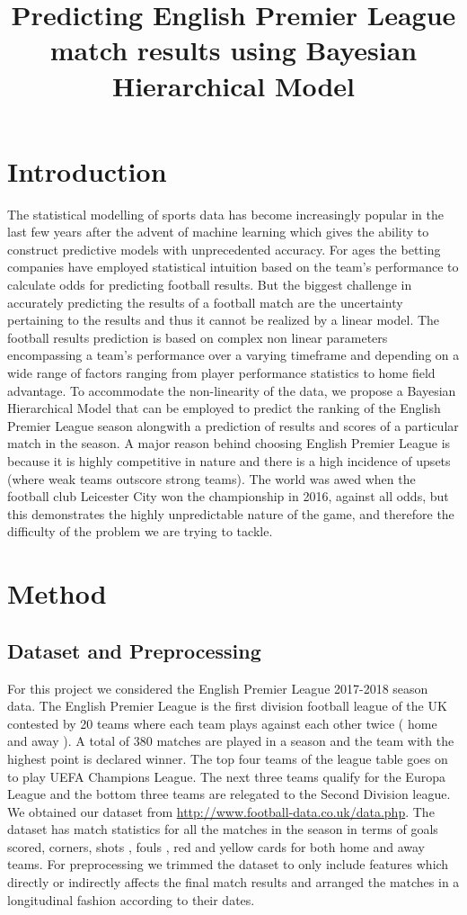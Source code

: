 \documentclass{article}
\title{Predicting English Premier League match results using Bayesian Hierarchical Model}
\begin{document}
\maketitle

\section{Introduction}
The statistical modelling of sports data has become increasingly popular in the last few years after the advent of machine learning which gives the ability to construct predictive models with unprecedented accuracy. For ages the betting companies have employed statistical intuition based on the team’s performance to calculate odds for predicting football results. But the biggest challenge in accurately predicting the results of a football match are the uncertainty pertaining to the results and thus it cannot be realized by a linear model. The football results prediction is based on complex non linear parameters encompassing a team’s performance over a varying timeframe and depending on a wide range of factors ranging from player performance statistics to home field advantage. To accommodate the non-linearity of the data, we propose a Bayesian Hierarchical Model that can be employed to predict the ranking of the English Premier League season alongwith a prediction of results and scores of a particular match in the season. A major reason behind choosing English Premier League is because it is highly competitive in nature and there is a high incidence of upsets (where weak teams outscore strong teams). The world was awed when the football club Leicester City won the championship in 2016, against all odds, but this demonstrates the highly unpredictable nature of the game, and therefore the difficulty of the problem we are trying to tackle.

\section{Method}

\subsection{Dataset and Preprocessing}
For this project we considered the English Premier League 2017-2018 season data. The English Premier League is the first division football league of the UK contested by 20 teams where each team plays against each other twice ( home and away ). A total of 380 matches are played in a season and the team with the highest point is declared winner. The top four teams of the league table goes on to play UEFA Champions League. The next three teams qualify for the Europa League and the bottom three teams are relegated to the Second Division league. We obtained our dataset from \url{http://www.football-data.co.uk/data.php}. The dataset has match statistics for all the matches in the season in terms of goals scored, corners, shots , fouls , red and yellow cards for both home and away teams. For preprocessing we trimmed the dataset to only include features which directly or indirectly affects the final match results and arranged the matches in a longitudinal fashion according to their dates.
\end{document}
